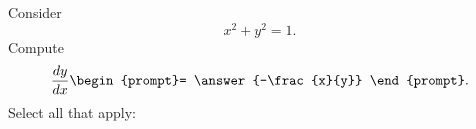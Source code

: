 \documentclass{ximera}
\author{Steven Gubkin}
\begin{document}
\begin{exercise}

Consider
\[
x^2+y^2 = 1.
\]
Compute
\[
\frac{dy}{dx} \begin{prompt}= \answer{-\frac{x}{y}}
\end{prompt}.
\]
Select all that apply:
\begin{selectAll}
\end{selectAll}
\end{exercise}
\end{document}

